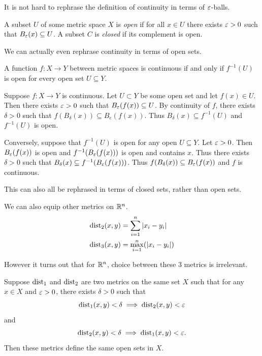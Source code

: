 \documentclass[letterpaper, 11pt, oneside]{book}
\begin{document}
It is not hard to rephrase the definition of continuity in terms of $\varepsilon$-balls.

\begin{defn}
  A subset $U$ of some metric space $X$ is \emph{open} if for all $x \in U$ there exists $\varepsilon > 0$ such that $B_{\varepsilon}(x) \subseteq U$.
  A subset $C$ is \emph{closed} if its complement is open.
\end{defn}

We can actually even rephrase continuity in terms of open sets.

\clearpage

\begin{prop}
  A function $f\colon X \to Y$ between metric spaces is continuous if and only if $f^{-1}(U)$ is open for every open set $U \subseteq Y$.
\end{prop}
\begin{pf}
  Suppose $f\colon X \to Y$ is continuous.
  Let $U \subset Y$ be some open set and let $f(x) \in U$.
  Then there exists $\varepsilon > 0$ such that $B_{\varepsilon}(f(x)) \subseteq U$.
  By continuity of $f$, there exists $\delta > 0$ such that $f(B_{\delta}(x)) \subseteq B_{e}(f(x))$.
  Thus $B_{\delta}(x) \subseteq f^{-1}(U)$ and $f^{-1}(U)$ is open.

  Conversely, suppose that $f^{-1}(U)$ is open for any open $U \subseteq Y$.
  Let $\varepsilon > 0$.
  Then $B_{\varepsilon}(f(x))$ is open and $f^{-1}(B_{\varepsilon}(f(x)))$ is open and contains $x$.
  Thus there exists $\delta > 0$ such that $B_{\delta}(x) \subseteq f^{-1}(B_{\varepsilon}(f(x)))$.
  Thus $f(B_{\delta}(x)) \subseteq B_{\varepsilon}(f(x))$ and $f$ is continuous.
\end{pf}

This can also all be rephrased in terms of closed sets, rather than open sets.

\begin{ex}
  We can also equip other metrics on $\mathbb{R}^{n}$.
  \begin{align*}
    \operatorname{dist}_{2}(x, y) &= \sum_{i = 1}^{n} \abs{x_{i} - y_{i}} \\
    \operatorname{dist}_{3}(x, y) &= \max_{i = 1}^{n} (\abs{x_{i} - y_{i}})
  \end{align*}
\end{ex}

However it turns out that for $\mathbb{R}^{n}$, choice between these 3 metrics is irrelevant.

\begin{prop}
  Suppose $\operatorname{dist}_{1}$ and $\operatorname{dist}_{2}$ are two metrics on the same set $X$ such that for any $x \in X$ and $\varepsilon > 0$, there exists $\delta > 0$ such that
  \[
    \operatorname{dist}_{1}(x, y) < \delta \implies \operatorname{dist}_{2}(x, y) < \varepsilon
  \]
  and
  \[
    \operatorname{dist}_{2}(x, y) < \delta \implies \operatorname{dist}_{1}(x, y) < \varepsilon.
  \]
  Then these metrics define the same open sets in $X$.
\end{prop}
\end{document}
